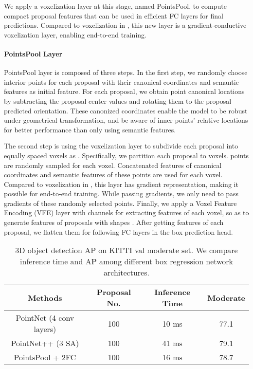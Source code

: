 \documentclass[10pt,twocolumn,letterpaper]{article}
\begin{document}
We apply a voxelization layer at this stage, named PointsPool, to compute compact proposal features that can be used in efficient FC layers for final predictions. Compared to voxelization in \cite{VOXELNET}, this new layer is a gradient-conductive voxelization layer, enabling end-to-end training.






\vspace{-0.1in}
\paragraph{PointsPool Layer}
PointsPool layer is composed of three steps. In the first step, we randomly choose  interior points for each proposal with their canonical coordinates and semantic features as initial feature. For each proposal, we obtain point canonical locations by subtracting the proposal center  values and rotating them to the proposal predicted orientation. These canonized coordinates enable the model to be robust under geometrical transformation, and be aware of inner points' relative locations for better performance than only using semantic features.

The second step is using the voxelization layer to subdivide each proposal into equally spaced voxels as \cite{VOXELNET}. Specifically, we partition each proposal to  voxels.  points are randomly sampled for each voxel. Concatenated features of canonical coordinates and semantic features of these points are used for each voxel. Compared to voxelization in \cite{VOXELNET}, this layer has gradient representation, making it possible for end-to-end training. While passing gradients, we only need to pass gradients of these randomly selected points. Finally, we apply a Voxel Feature Encoding (VFE) layer with channels  \cite{VOXELNET} for extracting features of each voxel, so as to generate features of proposals with shapes . 
After getting features of each proposal, we flatten them for following FC layers in the box prediction head. 

\begin{table}[t]
   \centering \addtolength{\tabcolsep}{-1pt}
   \footnotesize
   \begin{tabular}{|c|c|c|c|}
       \hline
       Methods & Proposal No. & Inference Time & Moderate \\
       \hline
       PointNet (4 conv layers) & 100 & 10 ms& 77.1  \\
       PointNet++ (3 SA) & 100 & 41 ms & 79.1 \\
       PointsPool + 2FC & 100 & 16 ms & 78.7 \\
      \hline
   \end{tabular}\vspace{0.3cm}
   \caption{3D object detection AP on KITTI val moderate set. We compare inference time and AP among different box regression network architectures.}
   \label{tab:whether_pointspool}
\end{table} 
\end{document}
